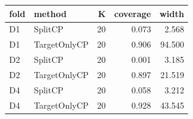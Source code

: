 \begin{tabular}{llrrr}
\toprule
fold & method & K & coverage & width \\
\midrule
D1 & SplitCP & 20 & 0.073 & 2.568 \\
D1 & TargetOnlyCP & 20 & 0.906 & 94.500 \\
D2 & SplitCP & 20 & 0.001 & 3.185 \\
D2 & TargetOnlyCP & 20 & 0.897 & 21.519 \\
D4 & SplitCP & 20 & 0.058 & 3.212 \\
D4 & TargetOnlyCP & 20 & 0.928 & 43.545 \\
\bottomrule
\end{tabular}
